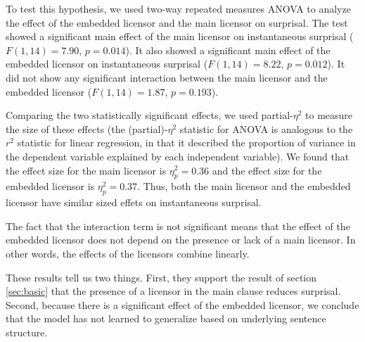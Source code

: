 \documentclass[11pt, round]{article}
\begin{document}
To test this hypothesis, we used two-way repeated measures ANOVA to analyze the effect of the embedded licensor and the main licensor on surprisal. The test showed a significant main effect of the main licensor on instantaneous surprisal ($F(1, 14) = 7.90$, $p = 0.014$). It also showed a significant main effect of the embedded licensor on instantaneous surprisal ($F(1, 14) = 8.22$, $p = 0.012$). It did not show any significant interaction between the main licensor and the embedded licensor ($F(1, 14) = 1.87$, $p = 0.193$).

Comparing the two statistically significant effects, we used partial-$\eta^2$ to measure the size of these effects (the (partial)-$\eta^2$ statistic for ANOVA is analogous to the $r^2$ statistic for linear regression, in that it described the proportion of variance in the dependent variable explained by each independent variable). We found that the effect size for the main licensor is $\eta_p^2 = 0.36$ and the effect size for the embedded licensor is $\eta_p^2 = 0.37$. Thus, both the main licensor and the embedded licensor have similar sized effets on instantaneous surprisal.

The fact that the interaction term is not significant means that the effect of the embedded licensor does not depend on the presence or lack of a main licensor. In other words, the effects of the licensors combine linearly.

These results tell us two things. First, they support the result of section \ref{sec:basic} that the presence of a licensor in the main clause reduces surprisal. Second, because there is a significant effect of the embedded licensor, we conclude that the model has not learned to generalize based on underlying sentence structure.
\end{document}
